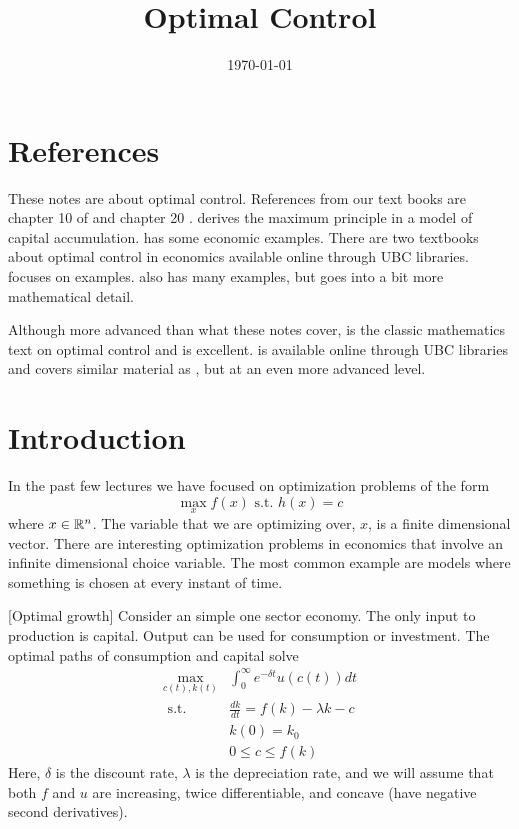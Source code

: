  

\title{Optimal Control}
\date{\today}



\maketitle

\section{References}

These notes are about optimal control.  References from our text books
are chapter 10 of \cite{dixit1990} and chapter 20 \cite{cw2005}.
\cite{dorfman1969} derives the maximum principle in a model of capital
accumulation. \cite{intriligator1975} has some economic
examples. There are two textbooks about optimal control in economics
available online through UBC libraries. \cite{sethi2000} focuses on
examples. \cite{caputo2005} also has many examples, but goes into a
bit more mathematical detail.

Although more advanced than what these notes cover,
\cite{luenberger1969} is the classic mathematics text on optimal
control and is excellent. \cite{clarke2013} is available online
through UBC libraries and covers similar material as
\cite{luenberger1969}, but at an even more advanced level. 


\section{Introduction}

In the past few lectures we have focused on optimization problems of the form 
\[ \max_{x} f(x) \text{ s.t. } h(x) = c \]
where $x \in\mathbb{R}^n$. The variable that we are optimizing over,
$x$, is a finite dimensional vector. There are interesting
optimization problems in economics that involve an infinite
dimensional choice variable. The most common example are models where
something is chosen at every instant of time.
\begin{example}\label{ex:grow}[Optimal growth]
  Consider an simple one sector economy. The only input to
  production is capital. Output can be used for consumption or
  investment. The optimal paths of consumption and capital solve
  \begin{align*}
    \max_{c(t),k(t)} & \int_0^\infty e^{-\delta t} u(c(t)) dt \\
    \text{ s.t. } & \frac{dk}{dt} = f(k) - \lambda k - c \\
    & k(0) = k_0 \\
    & 0 \leq c \leq f(k)
  \end{align*}
  Here, $\delta$ is the discount rate, $\lambda$ is the depreciation
  rate, and we will assume that both $f$ and $u$ are increasing, twice
  differentiable, and concave (have negative second derivatives).   
\end{example}

